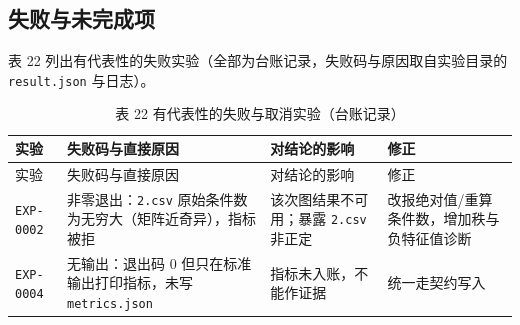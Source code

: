 \documentclass[
  a4paper,12pt]{article}
\begin{document}
\subsection{失败与未完成项}\label{ux5931ux8d25ux4e0eux672aux5b8cux6210ux9879}

表 22 列出有代表性的失败实验（全部为台账记录，失败码与原因取自实验目录的
\texttt{result.json} 与日志）。

\begin{longtable}[]{@{}
  >{\raggedright\arraybackslash}p{}
  >{\raggedright\arraybackslash}p{}
  >{\raggedright\arraybackslash}p{}
  >{\raggedright\arraybackslash}p{}@{}}
\caption{表 22 有代表性的失败与取消实验（台账记录）}\tabularnewline
\toprule\noalign{}
\begin{minipage}[b]{\linewidth}\raggedright
实验
\end{minipage} & \begin{minipage}[b]{\linewidth}\raggedright
失败码与直接原因
\end{minipage} & \begin{minipage}[b]{\linewidth}\raggedright
对结论的影响
\end{minipage} & \begin{minipage}[b]{\linewidth}\raggedright
修正
\end{minipage} \\
\midrule\noalign{}
\endfirsthead
\toprule\noalign{}
\begin{minipage}[b]{\linewidth}\raggedright
实验
\end{minipage} & \begin{minipage}[b]{\linewidth}\raggedright
失败码与直接原因
\end{minipage} & \begin{minipage}[b]{\linewidth}\raggedright
对结论的影响
\end{minipage} & \begin{minipage}[b]{\linewidth}\raggedright
修正
\end{minipage} \\
\midrule\noalign{}
\endhead
\bottomrule\noalign{}
\endlastfoot
\texttt{EXP-0002} & 非零退出：\texttt{2.csv}
原始条件数为无穷大（矩阵近奇异），指标被拒 & 该次图结果不可用；暴露
\texttt{2.csv} 非正定 & 改报绝对值/重算条件数，增加秩与负特征值诊断 \\
\texttt{EXP-0004} & 无输出：退出码 0 但只在标准输出打印指标，未写
\texttt{metrics.json} & 指标未入账，不能作证据 & 统一走契约写入 \\

\end{longtable}
\end{document}
